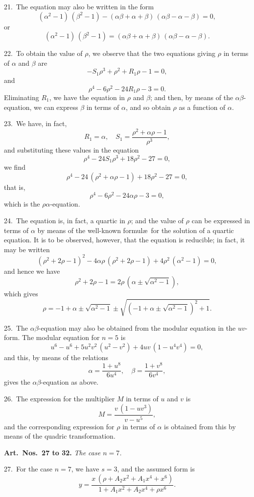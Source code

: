 \documentclass[11pt,a4paper]{book}
\begin{document}
21.\ The equation may also be written in the form
\[
(\alpha^2 - 1)\, (\beta^2 - 1) - (\alpha\beta + \alpha + \beta)\, (\alpha\beta - \alpha - \beta) = 0,
\]
or
\[
(\alpha^2 - 1)\, (\beta^2 - 1) = (\alpha\beta + \alpha + \beta)\, (\alpha\beta - \alpha - \beta).
\]

22.\ To obtain the value of $\rho$, we observe that the two equations giving $\rho$ in terms
of $\alpha$ and $\beta$ are
\[
-S_1 \rho^3 + \rho^2 + R_1 \rho - 1 = 0,
\]
and
\[
\rho^4 - 6\rho^2 - 24R_1 \rho - 3 = 0.
\]
Eliminating $R_1$, we have the equation in $\rho$ and $\beta$; and then, by means of the
$\alpha\beta$-equation, we can express $\beta$ in terms of $\alpha$, and so obtain $\rho$ as a function of $\alpha$.

23.\ We have, in fact,
\[
R_1 = \alpha, \quad S_1 = \frac{\rho^2 + \alpha\rho - 1}{\rho^3},
\]
and substituting these values in the equation
\[
\rho^4 - 24S_1 \rho^3 + 18\rho^2 - 27 = 0,
\]
we find
\[
\rho^4 - 24\, (\rho^2 + \alpha\rho - 1) + 18\rho^2 - 27 = 0,
\]
that is,
\[
\rho^4 - 6\rho^2 - 24\alpha\rho - 3 = 0,
\]
which is the $\rho\alpha$-equation.

24.\ The equation is, in fact, a quartic in $\rho$; and the value of $\rho$ can be expressed in
terms of $\alpha$ by means of the well-known formul\ae\ for the solution of a quartic equation.
It is to be observed, however, that the equation is reducible; in fact, it may be written
\[
(\rho^2 + 2\rho - 1)^2 - 4\alpha\rho\, (\rho^2 + 2\rho - 1) + 4\rho^2\, (\alpha^2 - 1) = 0,
\]
and hence we have
\[
\rho^2 + 2\rho - 1 = 2\rho\, (\alpha \pm \sqrt{\alpha^2 - 1}),
\]
which gives
\[
\rho = -1 + \alpha \pm \sqrt{\alpha^2 - 1} \pm \sqrt{(-1 + \alpha \pm \sqrt{\alpha^2 - 1})^2 + 1}.
\]

25.\ The $\alpha\beta$-equation may also be obtained from the modular equation in the $uv$-form.
The modular equation for $n = 5$ is
\[
u^6 - u^6 + 5u^2v^2\, (u^2 - v^2) + 4uv\, (1 - u^4v^4) = 0,
\]
and this, by means of the relations
\[
\alpha = \frac{1 + u^8}{6u^4}, \quad \beta = \frac{1 + v^8}{6v^4},
\]
gives the $\alpha\beta$-equation as above.

26.\ The expression for the multiplier $M$ in terms of $u$ and $v$ is
\[
M = \frac{v\, (1 - uv^3)}{v - u^5},
\]
and the corresponding expression for $\rho$ in terms of $\alpha$ is obtained from this by means
of the quadric transformation.

\newpage
\noindent\textbf{Art.\ Nos.\ 27 to 32.} \textit{The case $n = 7$.}

27.\ For the case $n = 7$, we have $s = 3$, and the assumed form is
\[
y = \frac{x\, (\rho + A_2 x^2 + A_1 x^4 + x^6)}{1 + A_1 x^2 + A_2 x^4 + \rho x^6}.
\]
\end{document}
